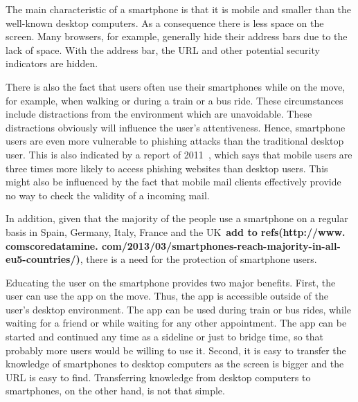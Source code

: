\begin{description}[leftmargin=0cm]
	\item[Mobility and Size] The main characteristic of a smartphone is that it is mobile and smaller than the well-known desktop computers.
 As a consequence there is less space on the screen.
 Many browsers, for example, generally hide their address bars due to the lack of space.
 With the address bar, the URL and other potential security indicators are hidden.
	\item[Distraction Caused by Mobility] There is also the fact that users often use their smartphones while on the move, for example, when walking or  during a train or a bus ride.
 These circumstances include distractions from the environment which are unavoidable.
 These distractions obviously will influence the user's attentiveness.
 Hence, smartphone users are even more vulnerable to phishing attacks than the traditional desktop user.
 This is also indicated by a report of 2011~\cite{trusteer2011}, which says that mobile users are three times more likely to access phishing websites than desktop users.
 This might also be influenced by the fact that mobile mail clients effectively provide no way to check the validity of a incoming mail.
	\item[High Number of Smartphone Users] In addition, given that the majority of the people use a smartphone on a regular basis in Spain, Germany, Italy, France and the UK~\textbf{add to refs(http://www.
comscoredatamine.
com/2013/03/smartphones-reach-majority-in-all-eu5-countries/)}, there is a need for the protection of smartphone users.
	\item[Benefits of Education on the Smartphone] Educating the user on the smartphone provides two major benefits.
 First, the user can use the app on the move.
 Thus, the app is accessible outside of the user's desktop environment.
 The app can be used during train or bus rides, while waiting for a friend or while waiting for any other appointment.
 The app can be started and continued any time as a sideline or just to bridge time, so that probably more users would be willing to use it.
 Second, it is easy to transfer the knowledge of smartphones to desktop computers as the screen is bigger and the URL is easy to find.
 Transferring knowledge from desktop computers to smartphones, on the other hand, is not that simple.
\end{description} 

 
 
 


